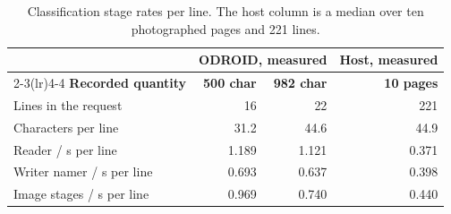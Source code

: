 \begin{table}[!htbp]\centering\small
\begin{tabular}{lrrr}\toprule
 & \multicolumn{2}{c}{\textbf{ODROID, measured}} & \textbf{Host, measured}\\
\cmidrule(lr){2-3}\cmidrule(lr){4-4}
\textbf{Recorded quantity} & \textbf{500 char} & \textbf{982 char} & \textbf{10 pages}\\\midrule
Lines in the request & 16 & 22 & 221\\
Characters per line & 31.2 & 44.6 & 44.9\\\midrule
Reader / s per line & 1.189 & 1.121 & 0.371\\
Writer namer / s per line & 0.693 & 0.637 & 0.398\\
Image stages / s per line & 0.969 & 0.740 & 0.440\\
\bottomrule\end{tabular}
\caption{Classification stage rates per line. The host column is a median
over ten photographed pages and 221 lines.}
\label{tab:res-r4-perline}
\end{table}
